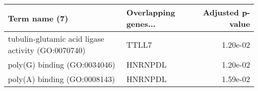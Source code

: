 \begin{tabular}{llr}
\toprule
                                     Term name (7) & Overlapping genes... &  Adjusted p-value \\
\midrule
tubulin-glutamic acid ligase activity (GO:0070740) &                TTLL7 &          1.20e-02 \\
                      poly(G) binding (GO:0034046) &              HNRNPDL &          1.20e-02 \\
                      poly(A) binding (GO:0008143) &              HNRNPDL &          1.59e-02 \\
\bottomrule
\end{tabular}
